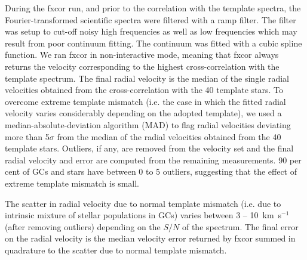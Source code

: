 \documentclass[useAMS,usenatbib]{mn2e}
\newcommand{\kms}{\mbox{\,km~s$^{-1}$}}
\begin{document}
During the fxcor run, and prior to the correlation with the template spectra, the Fourier-transformed scientific spectra were filtered with a ramp filter. The filter was setup to cut-off noisy high frequencies as well as low frequencies which may result from poor continuum fitting. The continuum was fitted with a cubic spline function.
We ran fxcor in non-interactive mode, meaning that fxcor always returns the velocity corresponding to the highest cross-correlation with the template spectrum. The final radial velocity is the median of the single radial velocities obtained from the cross-correlation with the 40 template stars. %
To overcome extreme template mismatch (i.e. the case in which the fitted radial velocity varies considerably depending on the adopted template), we used a median-absolute-deviation algorithm (MAD) to flag radial velocities deviating more than 5$\sigma$ from the median of the radial velocities obtained from the 40 template stars. Outliers, if any, are removed from the velocity set and the final radial velocity and error are computed from the remaining measurements. 90 per cent of GCs and stars have between 0 to 5 outliers, suggesting that the effect of extreme template mismatch is small. 

The scatter in radial velocity due to normal template mismatch (i.e. due to intrinsic mixture of stellar populations in GCs) varies between 3 -- 10 \kms (after removing outliers) depending on the $S/N$ of the spectrum. The final error on the radial velocity is the median velocity error returned by fxcor summed in quadrature to the scatter due to normal template mismatch. 
\end{document}

